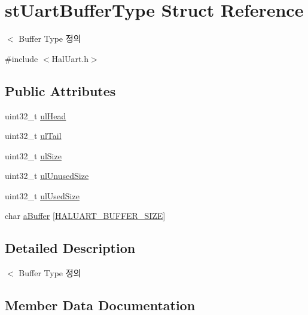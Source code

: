 \hypertarget{structst_uart_buffer_type}{}\section{st\+Uart\+Buffer\+Type Struct Reference}
\label{structst_uart_buffer_type}


$<$ Buffer Type 정의  




{\ttfamily \#include $<$Hal\+Uart.\+h$>$}

\subsection*{Public Attributes}
\begin{DoxyCompactItemize}
\item 
uint32\+\_\+t \mbox{\hyperlink{structst_uart_buffer_type_a1498849eb4865787c175ddefaab665de}{ul\+Head}}
\item 
uint32\+\_\+t \mbox{\hyperlink{structst_uart_buffer_type_a4eab85310ce02a57643032d572791908}{ul\+Tail}}
\item 
uint32\+\_\+t \mbox{\hyperlink{structst_uart_buffer_type_a7bd8d36a0ea72c0c11cfc648335cf29b}{ul\+Size}}
\item 
uint32\+\_\+t \mbox{\hyperlink{structst_uart_buffer_type_a1fbbfdb70fc3bf7e0d8b30a1f4f1a117}{ul\+Unused\+Size}}
\item 
uint32\+\_\+t \mbox{\hyperlink{structst_uart_buffer_type_a6de52817cb21b650a07a457858ed4df6}{ul\+Used\+Size}}
\item 
char \mbox{\hyperlink{structst_uart_buffer_type_a67a127f221eca4052c1db60d130ccf44}{a\+Buffer}} \mbox{[}\mbox{\hyperlink{_hal_uart_8h_acc135a3418cdda0439d13a2b0464520d}{H\+A\+L\+U\+A\+R\+T\+\_\+\+B\+U\+F\+F\+E\+R\+\_\+\+S\+I\+ZE}}\mbox{]}
\end{DoxyCompactItemize}


\subsection{Detailed Description}
$<$ Buffer Type 정의 

\subsection{Member Data Documentation}
\mbox{\label{structst_uart_buffer_type_a67a127f221eca4052c1db60d130ccf44}} 
